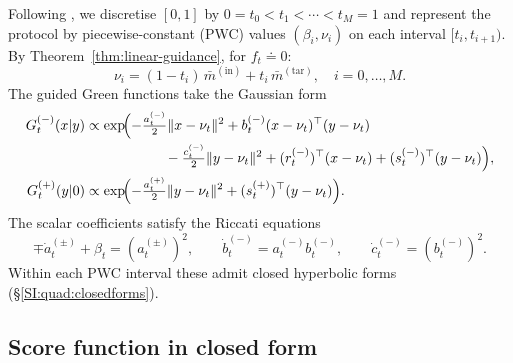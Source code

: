 \documentclass[11pt,onecolumn]{article}
\begin{document}
Following \cite{chertkov_adaptive_2025,chertkov_generative_2025}, we discretise $[0,1]$ by
$0=t_0<t_1<\cdots<t_M=1$ and represent the protocol by piecewise-constant
(PWC) values $(\beta_i,\nu_i)$ on each interval $[t_i,t_{i+1})$.
By Theorem~\ref{thm:linear-guidance}, for $f_t\doteq  0$:
\begin{equation}
  \nu_i = (1-t_i)\,\bar m^{(\mathrm{in})} + t_i\,\bar m^{(\mathrm{tar})},
  \quad i=0,\ldots,M.
  \label{SI:eq:nu-pwc-explicit}
\end{equation}
The guided Green functions take the Gaussian form
\begin{align}
  G_t^{(-)}(x|y)
  &\propto\exp\!\Bigl(
    -\tfrac{a_t^{(-)}}{2}\|x-\nu_t\|^2
    + b_t^{(-)}(x-\nu_t)^\top(y-\nu_t) \nonumber\\
  &\hspace{2cm}
    - \tfrac{c_t^{(-)}}{2}\|y-\nu_t\|^2
    + (r_t^{(-)})^\top(x-\nu_t)
    + (s_t^{(-)})^\top(y-\nu_t)\Bigr),
  \label{SI:eq:G-minus}\\
  G_t^{(+)}(y|0)
  &\propto\exp\!\Bigl(
    -\tfrac{a_t^{(+)}}{2}\|y-\nu_t\|^2
    + (s_t^{(+)})^\top(y-\nu_t)\Bigr).
  \label{SI:eq:G-plus}
\end{align}
The scalar coefficients satisfy the Riccati equations
\begin{equation}
  \mp\dot a_t^{(\pm)} + \beta_t = (a_t^{(\pm)})^2,
  \qquad
  \dot b_t^{(-)} = a_t^{(-)}b_t^{(-)},
  \qquad
  \dot c_t^{(-)} = (b_t^{(-)})^2.
  \label{SI:eq:riccati-abc}
\end{equation}
Within each PWC interval these admit closed hyperbolic forms
(\S\ref{SI:quad:closedforms}).

\subsection{Score function in closed form}
\label{SI:quad:score}
\end{document}
